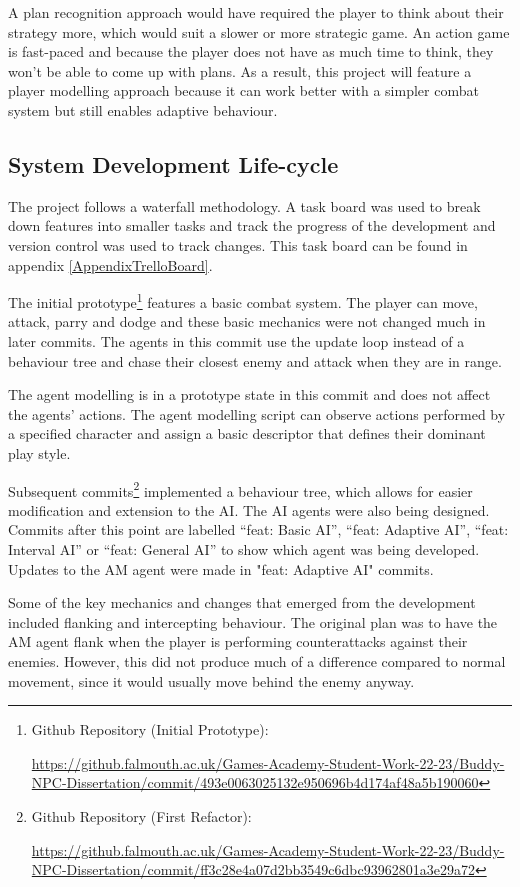 \documentclass{IEEEtran}
\begin{document}
A plan recognition approach would have required the player to think about their strategy more, which would suit a slower or more strategic game. An action game is fast-paced and because the player does not have as much time to think, they won't be able to come up with plans. As a result, this project will feature a player modelling approach because it can work better with a simpler combat system but still enables adaptive behaviour.

\subsection{System Development Life-cycle}
\label{DevLifecycle}

The project follows a waterfall methodology. A task board was used to break down features into smaller tasks and track the progress of the development and version control was used to track changes. This task board can be found in appendix \ref{AppendixTrelloBoard}.

The initial prototype\footnote{Github Repository (Initial Prototype):

\url{https://github.falmouth.ac.uk/Games-Academy-Student-Work-22-23/Buddy-NPC-Dissertation/commit/493e0063025132e950696b4d174af48a5b190060}} features a basic combat system. The player can move, attack, parry and dodge and these basic mechanics were not changed much in later commits. The agents in this commit use the update loop instead of a behaviour tree and chase their closest enemy and attack when they are in range.

The agent modelling is in a prototype state in this commit and does not affect the agents' actions. The agent modelling script can observe actions performed by a specified character and assign a basic descriptor that defines their dominant play style.

Subsequent commits\footnote{Github Repository (First Refactor):

\url{https://github.falmouth.ac.uk/Games-Academy-Student-Work-22-23/Buddy-NPC-Dissertation/commit/ff3c28e4a07d2bb3549c6dbc93962801a3e29a72}} implemented a behaviour tree, which allows for easier modification and extension to the AI. The AI agents were also being designed. Commits after this point are labelled “feat: Basic AI”, “feat: Adaptive AI”, “feat: Interval AI” or “feat: General AI” to show which agent was being developed. Updates to the AM agent were made in "feat: Adaptive AI" commits.

Some of the key mechanics and changes that emerged from the development included flanking and intercepting behaviour. The original plan was to have the AM agent flank when the player is performing counterattacks against their enemies. However, this did not produce much of a difference compared to normal movement, since it would usually move behind the enemy anyway.
\end{document}
